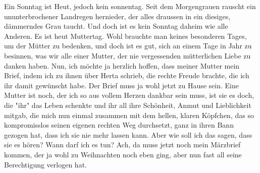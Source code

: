 \def\day{16. Mai 1943}
\mktitle

Ein Sonntag ist Heut, jedoch kein sonnentag.
Seit dem Morgengrauen rauscht ein ununterbrochener Landregen hernieder, der alles draussen in ein diesiges, d\"{a}mmerndes Grau taucht.
Und doch ist es kein Sonntag daheim wie alle Anderen.
Es ist heut Muttertag.
Wohl brauchte man keines besonderen Tages, um der M\"{u}tter zu bedenken, und doch ist es gut, sich an einem Tage in Jahr zu besinnen, was wir alle einer Mutter, der nie vergessenden m\"{u}tterlichen Liebe zu danken haben.
Nun, ich m\"{o}chte ja herzlich hoffen, dass meiner Mutter mein Brief, indem ich zu ihnen \"{u}ber Herta schrieb, die rechte Freude brachte, die ich ihr damit gew\"{u}nscht habe.
Der Brief muss ja wohl jetzt zu Hause sein.
Eine Mutter ist noch, der ich so aus vollem Herzen dankbar sein muss, ist sie es doch, die "ihr" das Leben schenkte und ihr all ihre Sch\"{o}nheit, Anmut und Lieblichkeit mitgab, die mich nun einmal zusammen mit dem hellen, klaren K\"{o}pfchen, das so kompromisslos seinen eigenen rechten Weg durchsetzt, ganz in ihren Bann gezogen hat, dass ich sie nie mehr lassen kann.
Aber wie soll ich das sagen, dass sie es h\"{o}ren?
Wann darf ich es tun?
Ach, da muss jetzt noch mein M\"{a}rzbrief kommen, der ja wohl zu Weihnachten noch eben ging, aber nun fast all seine Berechtigung verlogen hat.

\clearpage

